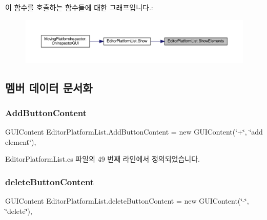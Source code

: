 이 함수를 호출하는 함수들에 대한 그래프입니다.\+:\nopagebreak
\begin{figure}[H]
\begin{center}
\leavevmode
\includegraphics[width=350pt]{df/d7a/class_editor_platform_list_a70c387e1de68662d17fae0513cdd7ae7_icgraph}
\end{center}
\end{figure}


\subsection{멤버 데이터 문서화}
\mbox{\label{class_editor_platform_list_a559a7c5291210aaca311116efb71b06f}} 
\subsubsection{\texorpdfstring{AddButtonContent}{AddButtonContent}}
{\footnotesize\ttfamily G\+U\+I\+Content Editor\+Platform\+List.\+Add\+Button\+Content = new G\+U\+I\+Content(\char`\"{}+\char`\"{}, \char`\"{}add element\char`\"{})\hspace{0.3cm}{\ttfamily [static]}, {\ttfamily [private]}}



Editor\+Platform\+List.\+cs 파일의 49 번째 라인에서 정의되었습니다.

\mbox{\label{class_editor_platform_list_ab1bcf67efe880dd93508b5fbd2b3f9b2}} 
\subsubsection{\texorpdfstring{deleteButtonContent}{deleteButtonContent}}
{\footnotesize\ttfamily G\+U\+I\+Content Editor\+Platform\+List.\+delete\+Button\+Content = new G\+U\+I\+Content(\char`\"{}-\/\char`\"{}, \char`\"{}delete\char`\"{})\hspace{0.3cm}{\ttfamily [static]}, {\ttfamily [private]}}



